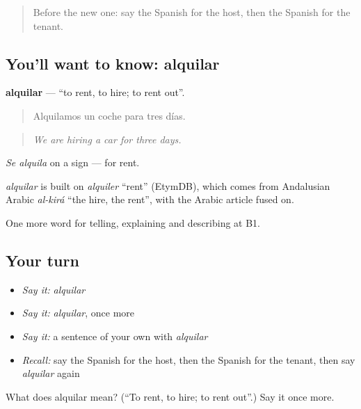 \label{lesson:ES-C667-alquilar}



\begin{quote}
Before the new one: say the Spanish for the host, then the Spanish for the tenant.
\end{quote}

\subsection*{You'll want to know: alquilar}
\textbf{alquilar} — \textquotedblleft{}to rent, to hire; to rent out\textquotedblright{}.

\begin{quote}
Alquilamos un coche para tres días.
\end{quote}

\begin{quote}
\emph{We are hiring a car for three days.}
\end{quote}

\emph{Se alquila} on a sign — for rent.

\begin{cousinweb}
\emph{alquilar} is built on \emph{alquiler} \textquotedblleft{}rent\textquotedblright{} (EtymDB), which comes from Andalusian Arabic \emph{al-kirá} \textquotedblleft{}the hire, the rent\textquotedblright{}, with the Arabic article fused on.
\end{cousinweb}

\begin{grammarlens}[title={What you've built}]
One more word for telling, explaining and describing at B1.
\end{grammarlens}

\subsection*{Your turn}
\begin{itemize}
\raggedright
  \item \emph{Say it:} \emph{alquilar}
  \item \emph{Say it:} \emph{alquilar}, once more
  \item \emph{Say it:} a sentence of your own with \emph{alquilar}
  \item \emph{Recall:} say the Spanish for the host, then the Spanish for the tenant, then say \emph{alquilar} again
\end{itemize}

\begin{tcolorbox}[breakable,colback=teal!4,colframe=teal!35!black,title={Before you move on}]
What does alquilar mean? (\textquotedblleft{}To rent, to hire; to rent out\textquotedblright{}.) Say it once more.
\end{tcolorbox}
